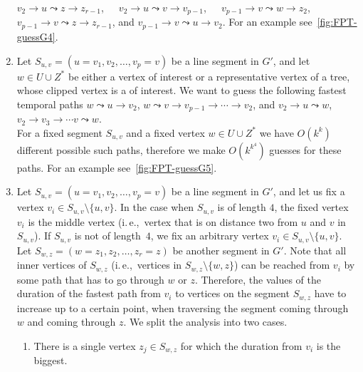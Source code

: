 \documentclass[a4paper,UKenglish,cleveref, autoref, thm-restate, anonymous]{lipics-v2021}
\newcommand{\ie}{i.\,e.,\ }
\begin{document}
\begin{enumerate}[G-1.]
    ${v_2 \rightarrow u \leadsto z \rightarrow z_{r-1}}$,\ \ \ 
    ${v_2 \rightarrow u \leadsto v \rightarrow v_{p-1}}$,\ \ \  
    ${v_{p-1} \rightarrow v \leadsto w \rightarrow z_{2}}$,\ \ \  
    ${v_{p-1} \rightarrow v \leadsto z \rightarrow z_{r-1}}$, and  
    ${v_{p-1} \rightarrow v \leadsto u \rightarrow v_{2}}$.
    For an example see~\cref{fig:FPT-guessG4}.
    \item \label{FPT:guess-uToSegmentz2}
    Let $S_{u,v} = (u=v_1,v_2, \dots, v_p = v)$ be a line segment in $G'$,
    and let $w \in U \cup Z^*$ be either a vertex of interest or a representative vertex of a tree, whose clipped vertex is a  of interest.
    We want to
    guess the following fastest temporal paths
    $w \leadsto u \rightarrow v_2$, $w \leadsto v \rightarrow v_{p-1} \rightarrow \cdots \rightarrow v_2$,
    and
    $v_2 \rightarrow u \leadsto w$, $v_2 \rightarrow v_3 \rightarrow \cdots v \leadsto w$.
    \\
    For a fixed segment $S_{u,v}$ and a fixed vertex $w \in U \cup Z^*$ we have $O(k^k)$ different possible such paths, therefore we make $O(k^{k^4})$ guesses for these paths.
    For an example see~\cref{fig:FPT-guessG5}.
    \item \label{FPT:guess-splitFromAnotherSegmentAndPaths}
    Let $S_{u,v} = (u=v_1,v_2, \dots, v_p = v)$ be a line segment in $G'$, and let us
    fix a vertex $v_i \in S_{u,v} \setminus \{u,v\}$.
    In the case when $S_{u,v}$ is of length $4$, the fixed vertex $v_i$ is the middle vertex (\ie vertex that is on distance two from $u$ and $v$ in $S_{u,v}$).
    If $S_{u,v}$ is not of length~$4$, we fix an arbitrary vertex $v_i \in S_{u,v} \setminus \{u,v\}$.
    Let 
    $S_{w,z} = (w=z_1,z_2, \dots, z_r = z)$ be another segment in $G'$.
    Note that all inner vertices of $S_{w,z}$ (\ie vertices in $S_{w,z} \setminus \{w,z\}$)
    can be reached from $v_i$ by some path that has to go through $w$ or $z$.
    Therefore, the values of the duration of the fastest path from $v_i$ to vertices on 
    the segment
    $S_{w,z}$ have to increase up to a certain point, when traversing the segment coming through $w$ and coming through $z$.
    We split the analysis into two cases.
    \begin{enumerate}
        \item 
    There is a single vertex $z_j \in S_{w,z}$ for which the duration from $v_i$ is the biggest.

\end{enumerate}
\end{enumerate}
\end{document}
